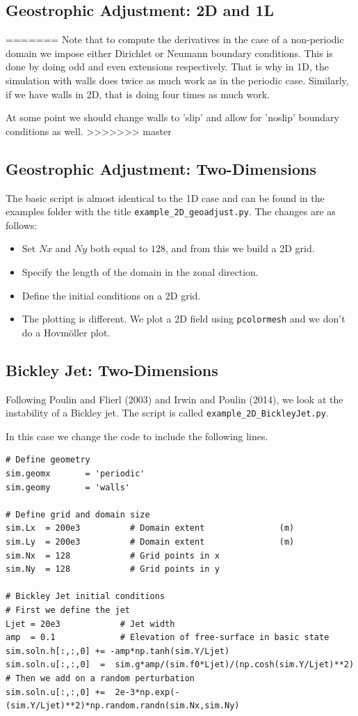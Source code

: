 \documentclass[11pt]{article}
\begin{document}
\subsection*{Geostrophic Adjustment: 2D and 1L}
=======
Note that to compute the derivatives in the case of a non-periodic domain we impose either Dirichlet or Neumann boundary conditions.  This is done by doing odd and even extensions respectively.  That is why in 1D, the simulation with walls does twice as much work as in the periodic case.  Similarly, if we have walls in 2D, that is doing four times as much work.

At some point we should change walls to 'slip' and allow for 'noslip' boundary conditions as well.
>>>>>>> master

\subsection*{Geostrophic Adjustment: Two-Dimensions}

The basic script is almost identical to the 1D case and can be found in the examples folder with the title {\tt example\_2D\_geoadjust.py}.  The changes are as follows:
\begin{itemize}
\item Set $Nx$ and $Ny$ both equal to $128$, and from this we build a 2D grid.   
\item Specify the length of the domain in the zonal direction.
\item Define the initial conditions on a 2D grid.
\item The plotting is different.  We plot a 2D field using {\tt pcolormesh} and we don't do a Hovm\"oller plot.
\end{itemize}

\subsection*{Bickley Jet: Two-Dimensions}

Following Poulin and Flierl (2003) and Irwin and Poulin (2014), we look at the instability of a Bickley jet.  The script is called {\tt example\_2D\_BickleyJet.py}.

In this case we change the code to include the following lines.
\begin{lstlisting}
# Define geometry
sim.geomx       = 'periodic'
sim.geomy       = 'walls'

# Define grid and domain size
sim.Lx  = 200e3          # Domain extent               (m)
sim.Ly  = 200e3          # Domain extent               (m)
sim.Nx  = 128            # Grid points in x
sim.Ny  = 128            # Grid points in y

# Bickley Jet initial conditions
# First we define the jet
Ljet = 20e3            # Jet width
amp  = 0.1             # Elevation of free-surface in basic state
sim.soln.h[:,:,0] += -amp*np.tanh(sim.Y/Ljet)
sim.soln.u[:,:,0]  =  sim.g*amp/(sim.f0*Ljet)/(np.cosh(sim.Y/Ljet)**2)
# Then we add on a random perturbation
sim.soln.u[:,:,0] +=  2e-3*np.exp(-(sim.Y/Ljet)**2)*np.random.randn(sim.Nx,sim.Ny)
\end{lstlisting}

\end{document}
